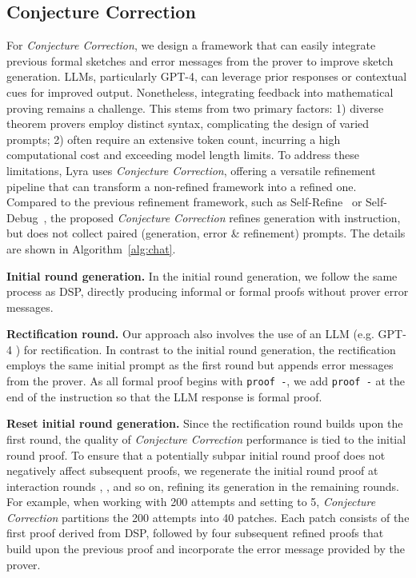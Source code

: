 \documentclass{article} \usepackage{iclr2024_conference,times}
\def\methodTwoFull{\textit{Conjecture Correction}\xspace}
\def\shortname{Lyra\xspace}
\begin{document}
\subsection{Conjecture Correction}
For \methodTwoFull, we design a framework that can easily integrate previous formal sketches and error messages from the prover to improve sketch generation. LLMs, particularly GPT-4, can leverage prior responses or contextual cues for improved output. Nonetheless, integrating feedback into mathematical proving remains a challenge. This stems from two primary factors: 1) diverse theorem provers employ distinct syntax, complicating the design of varied prompts; 2) often require an extensive token count, incurring a high computational cost and exceeding model length limits. To address these limitations, \shortname uses \methodTwoFull, offering a versatile refinement pipeline that can transform a non-refined framework into a refined one.  Compared to the previous refinement framework, such as Self-Refine~\citep{madaan2023selfrefine} or Self-Debug~\citep{chen2023teaching}, the proposed \methodTwoFull refines generation with instruction, but does not collect paired (generation, error \& refinement) prompts. The details are shown in Algorithm~\ref{alg:chat}.

\textbf{Initial round generation.}  In the initial round generation, we follow the same process as DSP, directly producing informal or formal proofs without prover error messages.

\textbf{Rectification round.} Our approach also involves the use of an LLM (e.g. GPT-4 \citep{bubeck2023sparks}) for rectification. In contrast to the initial round generation, the rectification employs the same initial prompt as the first round but appends error messages from the prover. As all formal proof begins with \texttt{proof -}, we add \texttt{proof -} at the end of the instruction so that the LLM response is formal proof.

\textbf{Reset initial round generation.} Since the rectification round builds upon the first round, the quality of \methodTwoFull performance is tied to the initial round proof. To ensure that a potentially subpar initial round proof does not negatively affect subsequent proofs, we regenerate the initial round proof at interaction rounds , ,  and so on, refining its generation in the remaining rounds.  For example, when working with 200 attempts and setting  to 5, \methodTwoFull partitions the 200 attempts into 40 patches. Each patch consists of the first proof derived from DSP, followed by four subsequent refined proofs that build upon the previous proof and incorporate the error message provided by the prover.
\end{document}
